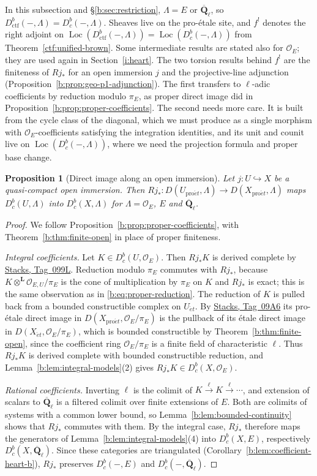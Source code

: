 \documentclass[11pt,a4paper]{article}
\numberwithin{equation}{section}
\newtheorem{proposition}[theorem]{Proposition}
\theoremstyle{definition}
\theoremstyle{remark}
\newcommand{\Dbc}{D^b_c}
\newcommand{\Loc}{\operatorname{Loc}}
\newcommand{\Qbar}{\overline{\mathbf Q}_\ell}
\newcommand{\et}{\acute{e}t}
\newcommand{\proet}{\mathrm{pro}\acute{e}t}
\newcommand{\stacks}[1]{\href{https://stacks.math.columbia.edu/tag/#1}{\textnormal{Stacks, Tag~#1}}}
\newcommand{\Dctf}{D^b_{\mathrm{ctf}}}
\begin{document}
In this subsection and \S\ref{b:sec:restriction}, $\Lambda=E$ or
$\Qbar$, so $\Dctf(-,\Lambda)=\Dbc(-,\Lambda)$. Sheaves live on the
pro-\'etale site, and $f^!$ denotes the right adjoint on
$\Loc(\Dctf(-,\Lambda))=\Loc(\Dbc(-,\Lambda))$ from
Theorem~\ref{ctf:unified-brown}. Some intermediate results are stated
also for $\mathcal O_E$; they are used again in Section~\ref{i:heart}.
The two torsion results behind $f^!$ are the finiteness of $Rj_*$ for
an open immersion $j$ and the projective-line adjunction
(Proposition~\ref{b:prop:geo-p1-adjunction}). The first transfers to
$\ell$-adic coefficients by reduction modulo $\pi_E$, as proper direct
image did in Proposition~\ref{b:prop:proper-coefficients}. The second
needs more care. It is built from the cycle class of the diagonal,
which we must produce as a single morphism with
$\mathcal O_E$-coefficients satisfying the integration identities, and
its unit and counit live on $\Loc(\Dbc(-,\Lambda))$, where we need the
projection formula and proper base change.

\begin{proposition}[Direct image along an open immersion]
\label{b:prop:open-coefficients}
Let $j:U\hookrightarrow X$ be a quasi-compact open immersion. Then
$Rj_*\colon D(U_{\proet},\Lambda)\to D(X_{\proet},\Lambda)$ maps $\Dbc(U,\Lambda)$ into $\Dbc(X,\Lambda)$ for
$\Lambda=\mathcal O_E$, $E$ and $\Qbar$.
\end{proposition}
\begin{proof}
We follow Proposition~\ref{b:prop:proper-coefficients}, with
Theorem~\ref{b:thm:finite-open} in place of proper finiteness.

\emph{Integral coefficients.} Let $K\in\Dbc(U,\mathcal O_E)$. Then
$Rj_*K$ is derived complete by \stacks{099L}. Reduction modulo $\pi_E$
commutes with $Rj_*$, because $K\otimes^{\mathbf L}\mathcal O_{E,U}/\pi_E$
is the cone of multiplication by $\pi_E$ on $K$ and $Rj_*$ is exact; this
is the same observation as in \eqref{b:eq:proper-reduction}. The
reduction of $K$ is pulled back from a bounded constructible complex on
$U_{\et}$. By \stacks{09A6} its pro-\'etale direct image in
$D(X_{\proet},\mathcal O_E/\pi_E)$ is the pullback of its \'etale direct
image in $D(X_{\et},\mathcal O_E/\pi_E)$, which is bounded constructible by
Theorem~\ref{b:thm:finite-open}, since the coefficient ring
$\mathcal O_E/\pi_E$ is a finite field of characteristic $\ell$. Thus
$Rj_*K$ is derived complete with bounded constructible reduction, and
Lemma~\ref{b:lem:integral-models}(2) gives $Rj_*K\in\Dbc(X,\mathcal O_E)$.

\emph{Rational coefficients.} Inverting $\ell$ is the colimit of
$K\xrightarrow{\ell}K\xrightarrow{\ell}\cdots$, and extension of scalars
to $\Qbar$ is a filtered colimit over finite extensions of $E$. Both are
colimits of systems with a common lower bound, so
Lemma~\ref{b:lem:bounded-continuity} shows that $Rj_*$ commutes with
them. By the integral case, $Rj_*$ therefore maps the generators of
Lemma~\ref{b:lem:integral-models}(4) into $\Dbc(X,E)$, respectively
$\Dbc(X,\Qbar)$. Since these categories are triangulated
(Corollary~\ref{b:lem:coefficient-heart-b}), $Rj_*$ preserves
$\Dbc(-,E)$ and $\Dbc(-,\Qbar)$.
\end{proof}
\end{document}
